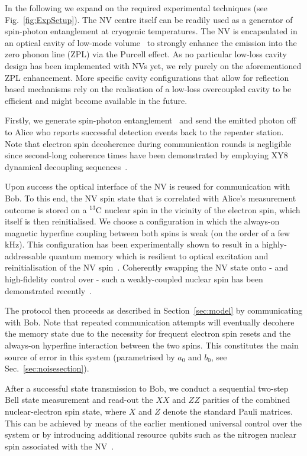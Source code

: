 \documentclass[aps,pra,reprint,superscriptaddress]{revtex4-1}
\begin{document}
In the following we expand on the required experimental techniques (see Fig.~\ref{fig:ExpSetup}). The NV centre itself can be readily used as a generator of spin-photon entanglement at cryogenic temperatures. The NV is encapsulated in an optical cavity of low-mode volume~\cite{riedel2017deterministic} to strongly enhance the emission into the zero phonon line (ZPL) via the Purcell effect. As no particular low-loss cavity design has been implemented with NVs yet, we rely purely on the aforementioned ZPL enhancement. More specific cavity configurations that allow for reflection based mechanisms rely on the realisation of a low-loss overcoupled cavity to be efficient \cite{duan2004scalable} and might become available in the future.

Firstly, we generate spin-photon entanglement~\cite{pfaff2014unconditional} and send the emitted photon off to Alice who reports successful detection events back to the repeater station. Note that electron spin decoherence during communication rounds is negligible since second-long coherence times have been demonstrated by employing XY8 dynamical decoupling sequences~\cite{abobeih2018one}.

Upon success the optical interface of the NV is reused for communication with Bob. To this end, the NV spin state that is correlated with Alice's measurement outcome is stored on a $^{13}$C nuclear spin in the vicinity of the electron spin, which itself is then reinitialised. We choose a configuration in which the always-on magnetic hyperfine coupling between both spins is weak (on the order of a few $\mathrm{kHz}$). This configuration has been experimentally shown to result in a highly-addressable quantum memory which is resilient to optical excitation and reinitialisation of the NV spin~\cite{reiserer2016robust}. Coherently swapping the NV state onto - and high-fidelity control over - such a weakly-coupled nuclear spin has been demonstrated recently~\cite{taminiau2014universal,kalb2017entanglement}.

The protocol then proceeds as described in Section~\ref{sec:model} by communicating with Bob. Note that repeated communication attempts will eventually decohere the memory state due to the necessity for frequent electron spin resets and the always-on hyperfine interaction between the two spins. This constitutes the main source of error in this system (parametrised by $a_0$ and $b_0$, see Sec.~\ref{sec:noisesection}).

After a successful state transmission to Bob, we conduct a sequential two-step Bell state measurement and read-out the $XX$ and $ZZ$ parities of the combined nuclear-electron spin state, where $X$ and $Z$ denote the standard Pauli matrices. This can be achieved by means of the earlier mentioned universal control over the system or by introducing additional resource qubits such as the nitrogen nuclear spin associated with the NV~\cite{pfaff2014unconditional}.
\end{document}

